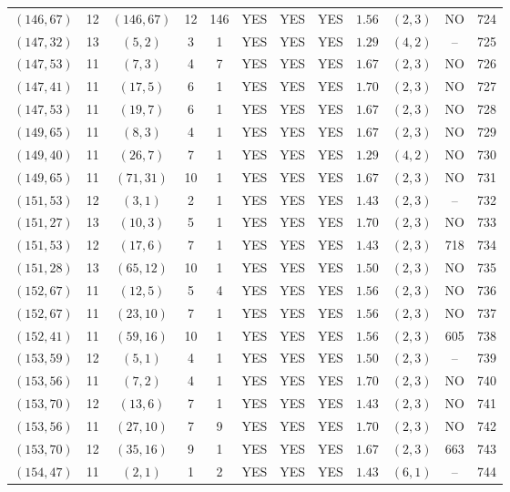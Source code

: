 \begin{longtable}{|c|c|c|c|c|c|c|c|c|c|c|c|}
$(146,67)$ & 12 & $(146,67)$ & 12 & 146 & YES & YES & YES & $1.56$ & $(2,3)$ & NO & 724\\
$(147,32)$ & 13 & $(5,2)$ & 3 & 1 & YES & YES & YES & $1.29$ & $(4,2)$ & -- & 725\\
$(147,53)$ & 11 & $(7,3)$ & 4 & 7 & YES & YES & YES & $1.67$ & $(2,3)$ & NO & 726\\
$(147,41)$ & 11 & $(17,5)$ & 6 & 1 & YES & YES & YES & $1.70$ & $(2,3)$ & NO & 727\\
$(147,53)$ & 11 & $(19,7)$ & 6 & 1 & YES & YES & YES & $1.67$ & $(2,3)$ & NO & 728\\
$(149,65)$ & 11 & $(8,3)$ & 4 & 1 & YES & YES & YES & $1.67$ & $(2,3)$ & NO & 729\\
$(149,40)$ & 11 & $(26,7)$ & 7 & 1 & YES & YES & YES & $1.29$ & $(4,2)$ & NO & 730\\
$(149,65)$ & 11 & $(71,31)$ & 10 & 1 & YES & YES & YES & $1.67$ & $(2,3)$ & NO & 731\\
$(151,53)$ & 12 & $(3,1)$ & 2 & 1 & YES & YES & YES & $1.43$ & $(2,3)$ & -- & 732\\
$(151,27)$ & 13 & $(10,3)$ & 5 & 1 & YES & YES & YES & $1.70$ & $(2,3)$ & NO & 733\\
$(151,53)$ & 12 & $(17,6)$ & 7 & 1 & YES & YES & YES & $1.43$ & $(2,3)$ & 718 & 734\\
$(151,28)$ & 13 & $(65,12)$ & 10 & 1 & YES & YES & YES & $1.50$ & $(2,3)$ & NO & 735\\
$(152,67)$ & 11 & $(12,5)$ & 5 & 4 & YES & YES & YES & $1.56$ & $(2,3)$ & NO & 736\\
$(152,67)$ & 11 & $(23,10)$ & 7 & 1 & YES & YES & YES & $1.56$ & $(2,3)$ & NO & 737\\
$(152,41)$ & 11 & $(59,16)$ & 10 & 1 & YES & YES & YES & $1.56$ & $(2,3)$ & 605 & 738\\
$(153,59)$ & 12 & $(5,1)$ & 4 & 1 & YES & YES & YES & $1.50$ & $(2,3)$ & -- & 739\\
$(153,56)$ & 11 & $(7,2)$ & 4 & 1 & YES & YES & YES & $1.70$ & $(2,3)$ & NO & 740\\
$(153,70)$ & 12 & $(13,6)$ & 7 & 1 & YES & YES & YES & $1.43$ & $(2,3)$ & NO & 741\\
$(153,56)$ & 11 & $(27,10)$ & 7 & 9 & YES & YES & YES & $1.70$ & $(2,3)$ & NO & 742\\
$(153,70)$ & 12 & $(35,16)$ & 9 & 1 & YES & YES & YES & $1.67$ & $(2,3)$ & 663 & 743\\
$(154,47)$ & 11 & $(2,1)$ & 1 & 2 & YES & YES & YES & $1.43$ & $(6,1)$ & -- & 744\\

\end{longtable}
